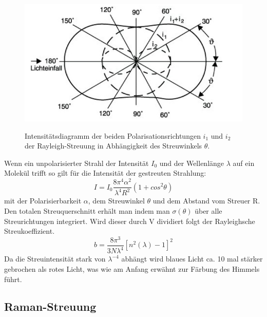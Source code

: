 \documentclass[.../bericht]{subfilies}
\begin{document}
      \begin{figure}[H]
        \begin{center}
          \fbox
          {
          \includegraphics[scale=1]{figures/rstreuung}
          }
          \caption{Intensitätsdiagramm der beiden Polarisationsrichtungen $i_1$ und $i_2$ der Rayleigh-Streuung in Abhängigkeit des Streuwinkels $\theta$. \cite{spektrum:rayleigh}
          }
        \end{center}
      \end{figure}
      Wenn ein unpolarisierter Strahl der Intensität $I_0$ und der Wellenlänge $\lambda$ auf ein Molekül trifft so gilt für die Intensität der gestreuten Strahlung:
      \begin{equation}
        I=I_0\frac{8\pi^4 \alpha^2}{\lambda^4 R^2}(1+cos^2\theta)
        \label{eq:rayleighi}
      \end{equation}
      mit der Polarisierbarkeit $\alpha$, dem Streuwinkel $\theta$ und dem Abstand vom Streuer R.\\
      Den totalen Streuquerschnitt erhält man indem man $\sigma(\theta)$ über alle Streurichtungen integriert. Wird dieser durch V dividiert folgt der Rayleighsche Streukoeffizient.
      \begin{equation*}
        b=\frac{8\pi^3}{3N\lambda^4}[n^2(\lambda)-1]^2
      \end{equation*}
      Da die Streuintensität stark von $\lambda^{-4}$ abhängt wird blaues Licht ca. 10 mal stärker gebrochen als rotes Licht, was wie am Anfang erwähnt zur Färbung des Himmels führt.
      \cite{cosmos} \cite{wiki:rayleigh} \cite{spektrum:rayleigh}

    \subsection{Raman-Streuung}
    \label{ssec:Raman-Streuung}
\end{document}
